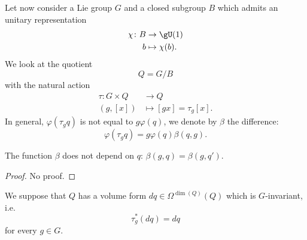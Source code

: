 Let now consider a Lie group $G$ and a closed subgroup $B$ which admits an unitary representation 
\begin{equation}
	\begin{aligned}
		\chi\colon B&\to \gU(1) \\
		b&\mapsto \chi(b).
	\end{aligned}
\end{equation}
We look at the quotient
\begin{equation}
	Q=G/B
\end{equation}
with the natural action
\begin{equation}
	\begin{aligned}
		\tau\colon G\times Q&\to Q \\
		(g,[x])&\mapsto [gx]=\tau_g[x].
	\end{aligned}
\end{equation}
In general, $\varphi(\tau_gq)$ is not equal to $g\varphi(q)$, we denote by $\beta$ the difference:
\begin{equation}			\label{EqDefBetavptaunotEqual}
	\varphi(\tau_g q)=g\varphi(q)\beta(q,g).
\end{equation}
\begin{lemma}
	The function $\beta$ does not depend on $q$: $\beta(g,q)=\beta(g,q')$.
\end{lemma}
\begin{proof}
	No proof.
\end{proof}

We suppose that $Q$ has a volume form $dq\in\Omega^{\dim(Q)}(Q)$ which is $G$-invariant, i.e.
\begin{equation}
	\tau^*_g(dq)=dq
\end{equation}
for every $g\in G$.

